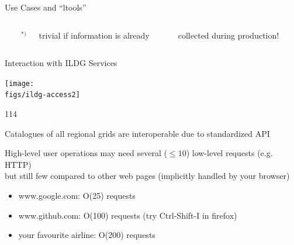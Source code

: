 \documentclass[aspectratio=169,xcolor=dvipsnames]{beamer}
\newcommand{\bi}{\begin{itemize}}
\newcommand{\ei}{\end{itemize}}
\def\figs{figs3}
\begin{document}
\begin{frame}{Use Cases and  ``ltools''}
  \vspace*{5mm}
  \begin{columns}  
    \column{\lcol}
    ~
    \column{\rcol}
           {\small \parbox{2em}{\hfill ${}^{*)}$} trivial if information is already\\
             \parbox{2em}{~} collected during production!}
  \end{columns}

\end{frame}
\begin{frame}{Interaction with ILDG Services}

  \begin{center}
    \texttt{[image: \\figs/ildg-access2]}
  \end{center}

  \begin{dinglist}{114}
    \item Catalogues of all regional grids are \alert{interoperable} due to standardized API

    \item  High-level user operations may need several ($\le 10$) low-level requests (e.g. HTTP)\\
      but still few compared to other web pages (implicitly handled by your browser)
      \bi
    \item www.google.com: O(25) requests 
    \item www.github.com: O(100) requests \hspace*{20mm} (try Ctrl-Shift-I in firefox)
    \item your favourite airline: O(200) requests
      \ei
  \end{dinglist}
  \vfill
\end{frame}
\end{document}
